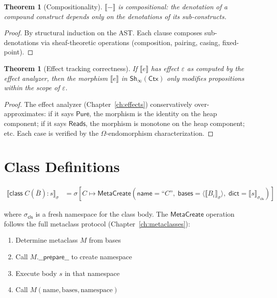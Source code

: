 \documentclass[11pt,a4paper]{report}
\theoremstyle{definition}
\theoremstyle{plain}
\newtheorem{theorem}[definition]{Theorem}
\newcommand{\den}[1]{\llbracket #1 \rrbracket}
\newcommand{\Ctx}{\mathsf{Ctx}}
\newcommand{\Pure}{\mathsf{Pure}}
\newcommand{\Reads}{\mathsf{Reads}}
\newcommand{\Sh}{\mathsf{Sh}}
\begin{document}
\begin{theorem}[Compositionality]
\label{thm:compositionality}
$\den{-}$ is compositional: the denotation of a compound construct depends
only on the denotations of its sub-constructs.
\end{theorem}
\begin{proof}
By structural induction on the AST.  Each clause composes sub-denotations
via sheaf-theoretic operations (composition, pairing, casing, fixed-point).
\end{proof}

\begin{theorem}[Effect tracking correctness]
\label{thm:effect-correct}
If $\den{e}$ has effect $\varepsilon$ as computed by the effect analyzer, then
the morphism $\den{e}$ in $\Sh_\infty(\Ctx)$ only modifies propositions within
the scope of $\varepsilon$.
\end{theorem}
\begin{proof}
The effect analyzer (Chapter~\ref{ch:effects}) conservatively over-approximates:
if it says $\Pure$, the morphism is the identity on the heap component; if it
says $\Reads$, the morphism is monotone on the heap component; etc.  Each case
is verified by the $\Omega$-endomorphism characterization.
\end{proof}


\section{Class Definitions}

\begin{align}
  \den{\mathsf{class}\;C(\bar{B}):s}_\sigma
    &= \sigma\!\left[C \mapsto \mathsf{MetaCreate}\!\left(
       \mathsf{name} = \text{``$C$''},\;
       \mathsf{bases} = \langle\den{B_i}_\sigma\rangle,\;
       \mathsf{dict} = \den{s}_{\sigma_{\mathsf{cls}}}
    \right)\right]
\end{align}

where $\sigma_{\mathsf{cls}}$ is a fresh namespace for the class body.  The
$\mathsf{MetaCreate}$ operation follows the full metaclass protocol
(Chapter~\ref{ch:metaclasses}):
\begin{enumerate}
  \item Determine metaclass $M$ from bases
  \item Call $M.\mathsf{\_\_prepare\_\_}$ to create namespace
  \item Execute body $s$ in that namespace
  \item Call $M(\text{name}, \text{bases}, \text{namespace})$
\end{enumerate}
\end{document}
